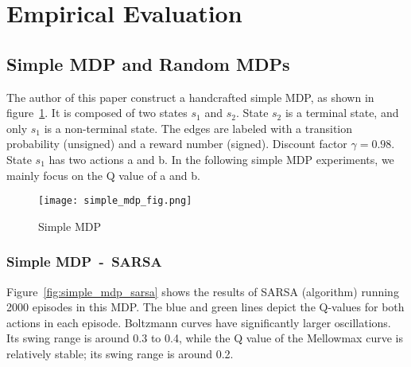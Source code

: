 \section{Empirical Evaluation}
\label{section:evaluation}




\subsection{Simple MDP and Random MDPs}

The author of this paper construct a handcrafted simple MDP, as shown in figure\ \ref{fig:simple_mdp}.
It is composed of two states $s_1$ and $s_2$. State $s_2$ is a terminal state, and only $s_1$ is a non-terminal state.
The edges are labeled with a transition probability (unsigned) and a reward number (signed). Discount factor $\gamma=0.98$.
State $s_1$ has two actions a and b. In the following simple MDP experiments, we mainly focus on the Q value of a and b.


\begin{figure}[H]
    \centering
    \texttt{[image: simple\_mdp\_fig.png]}
    \caption{Simple MDP}\label{fig:simple_mdp}
\end{figure}

\subsubsection{Simple MDP\ -\ SARSA}

Figure\ \ref{fig:simple_mdp_sarsa} shows the results of SARSA (algorithm) running 2000 episodes in this MDP. 
The blue and green lines depict the Q-values for both actions in each episode. 
Boltzmann curves have significantly larger oscillations. 
Its swing range is around 0.3 to 0.4, while the Q value of the Mellowmax curve is
relatively stable; its swing range is around 0.2.

